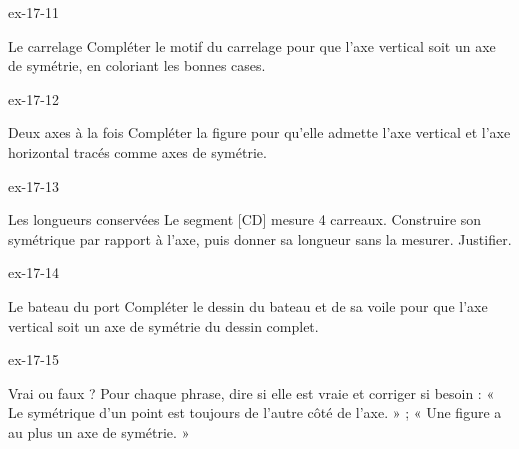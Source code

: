 \begin{blocLivre}{ex-17-11}\begin{exercice}[3]{Le carrelage}
Compléter le motif du carrelage pour que l’axe vertical soit un axe de symétrie, en coloriant les bonnes cases.
\label{fig-ex-17-11}
\end{exercice}\end{blocLivre}
\begin{blocLivre}{ex-17-12}\begin{exercice}[3]{Deux axes à la fois}
Compléter la figure pour qu’elle admette l’axe vertical et l’axe horizontal tracés comme axes de symétrie.
\label{fig-ex-17-12}
\end{exercice}\end{blocLivre}
\begin{blocLivre}{ex-17-13}\begin{exercice}[3]{Les longueurs conservées}
Le segment [CD] mesure 4 carreaux. Construire son symétrique par rapport à l’axe, puis donner sa longueur sans la mesurer. Justifier.
\label{fig-ex-17-13}
\end{exercice}\end{blocLivre}
\begin{blocLivre}{ex-17-14}\begin{exercice}[3]{Le bateau du port}
Compléter le dessin du bateau et de sa voile pour que l’axe vertical soit un axe de symétrie du dessin complet.
\label{fig-ex-17-14}
\end{exercice}\end{blocLivre}
\begin{blocLivre}{ex-17-15}\begin{exercice}[3]{Vrai ou faux ?}
Pour chaque phrase, dire si elle est vraie et corriger si besoin : « Le symétrique d’un point est toujours de l’autre côté de l’axe. » ; « Une figure a au plus un axe de symétrie. »
\label{fig-ex-17-15}
\end{exercice}\end{blocLivre}

\clearpage
